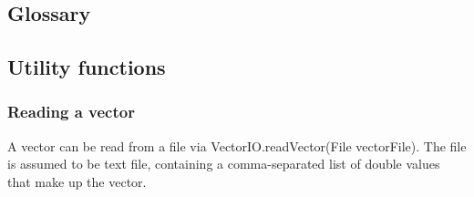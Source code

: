 \documentclass[11pt]{article} %
\newcommand{\code}{}
\begin{document}
\appendix{}
\subsection{Glossary}
\subsection{Utility functions}
\subsubsection{Reading a vector} \label{sec:read_vec}
A vector can be read from a file via \code{VectorIO.readVector(File vectorFile)}. The file is assumed to be text file, containing a comma-separated list of double values that make up the vector.
\end{document}
